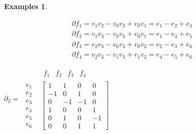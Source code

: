 \documentclass[draft,toc=bib]{scrartcl}
\theoremstyle{plain}
\theoremstyle{definition}
\newtheorem{examples}[theorem]{Examples}
\theoremstyle{remark}
\begin{document}
\begin{examples}
\begin{enumerate}
 \parbox[c]{.6\linewidth}{
 \begin{align*}
 	\partial f_1=v_1v_2-v_0v_2+v_0v_1=e_1-e_2+e_4\\
 	\partial f_2=v_1v_3-v_0v_3+v_0v_1=e_1-e_3+e_5\\
 	\partial f_3=v_2v_3-v_0v_3+v_0v_2=e_2-e_3+e_6\\
 	\partial f_4=v_2v_3-v_1v_3+v_1v_2=e_4-e_5+e_6
 \end{align*}}%
\parbox[c]{.4\linewidth}{
	$\partial_2=\begin{matrix}
		 	&\begin{matrix}f_1	&f_2	&f_3	&f_4\end{matrix}\\
		\begin{matrix}
		e_1	\\
		e_2	\\
		e_3	\\
		e_4	\\
		e_5	\\
		e_6	
		\end{matrix}&
		\begin{bmatrix}
		1		&1		&0		&0\\
		-1		&0		&1		&0\\
		0		&-1		&-1		&0\\
		1		&0		&0		&1\\
		0		&1		&0		&-1\\
		0		&0		&1		&1
		\end{bmatrix}
	\end{matrix}$	
}


\end{enumerate}
\end{examples}
\end{document}
